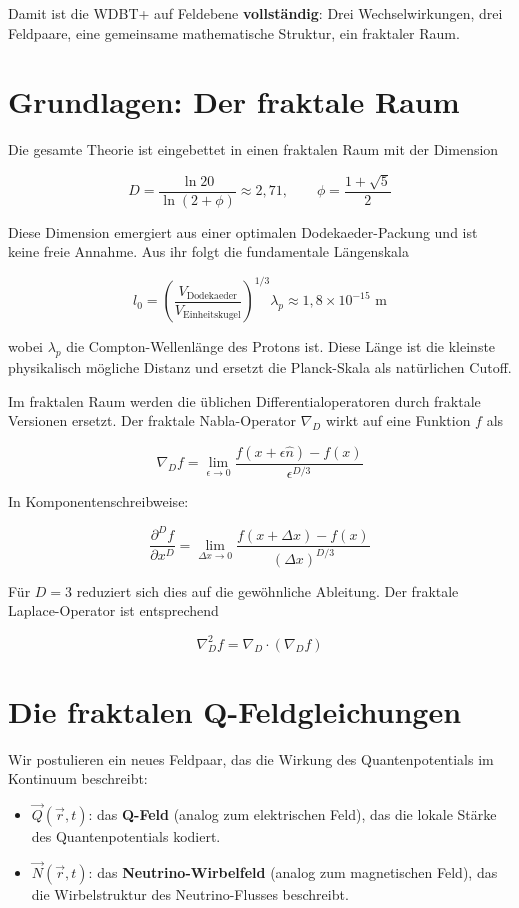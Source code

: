 \documentclass[12pt,a4paper]{article}
\begin{document}
Damit ist die WDBT+ auf Feldebene \textbf{vollständig}: Drei Wechselwirkungen, drei Feldpaare, eine gemeinsame mathematische Struktur, ein fraktaler Raum.

\section{Grundlagen: Der fraktale Raum}

Die gesamte Theorie ist eingebettet in einen fraktalen Raum mit der Dimension

\[
D = \frac{\ln 20}{\ln(2 + \phi)} \approx 2,71, \qquad \phi = \frac{1 + \sqrt{5}}{2}
\]

Diese Dimension emergiert aus einer optimalen Dodekaeder-Packung und ist keine freie Annahme. Aus ihr folgt die fundamentale Längenskala

\[
l_0 = \left( \frac{V_{\text{Dodekaeder}}}{V_{\text{Einheitskugel}}} \right)^{1/3} \lambda_p \approx 1,8 \times 10^{-15} \text{ m}
\]

wobei \(\lambda_p\) die Compton-Wellenlänge des Protons ist. Diese Länge ist die kleinste physikalisch mögliche Distanz und ersetzt die Planck-Skala als natürlichen Cutoff.

Im fraktalen Raum werden die üblichen Differentialoperatoren durch fraktale Versionen ersetzt. Der fraktale Nabla-Operator \(\nabla_D\) wirkt auf eine Funktion \(f\) als

\[
\nabla_D f = \lim_{\epsilon \to 0} \frac{f(x + \epsilon\hat{n}) - f(x)}{\epsilon^{D/3}}
\]

In Komponentenschreibweise:

\[
\frac{\partial^D f}{\partial x^D} = \lim_{\Delta x \to 0} \frac{f(x + \Delta x) - f(x)}{(\Delta x)^{D/3}}
\]

Für \(D = 3\) reduziert sich dies auf die gewöhnliche Ableitung. Der fraktale Laplace-Operator ist entsprechend

\[
\nabla_D^2 f = \nabla_D \cdot (\nabla_D f)
\]

\section{Die fraktalen Q-Feldgleichungen}

Wir postulieren ein neues Feldpaar, das die Wirkung des Quantenpotentials im Kontinuum beschreibt:

\begin{itemize}
    \item \(\vec{Q}(\vec{r}, t)\): das \textbf{Q-Feld} (analog zum elektrischen Feld), das die lokale Stärke des Quantenpotentials kodiert.
    \item \(\vec{N}(\vec{r}, t)\): das \textbf{Neutrino-Wirbelfeld} (analog zum magnetischen Feld), das die Wirbelstruktur des Neutrino-Flusses beschreibt.
\end{itemize}
\end{document}
